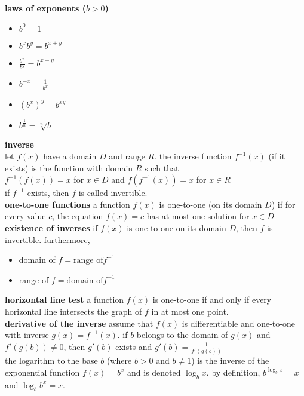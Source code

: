 \documentclass{article}
\begin{document}
\textbf{laws of exponents ($b > 0$)}
	\begin{itemize}
		\item $b^0 = 1$
		\item $b^xb^y = b^{x + y}$
		\item $\frac{b^x}{b^y} = b^{x - y}$
		\item $b^{-x} = \frac{1}{b^x}$
		\item $(b^x)^y = b^{xy}$
		\item $b^{\frac{1}{n}} = \sqrt[n]{b}$
	\end{itemize}

\textbf{inverse}\\
let $f(x)$ have a domain $D$ and range $R$. the inverse function $f^{-1}(x)$ (if it exists) is the function with domain $R$ such that\\ $f^{-1}(f(x)) = x$ for $x \in D$ and $f(f^{-1}(x)) = x$ for $x \in R$\\ if $f^{-1}$ exists, then $f$ is called invertible.\\

\textbf{one-to-one functions} a function $f(x)$ is one-to-one (on its domain $D$) if for every value $c$, the equation $f(x) = c$ has at most one solution for $x \in D$\\

\textbf{existence of inverses} if $f(x)$ is one-to-one on its domain $D$, then $f$ is invertible. furthermore,
	\begin{itemize}
		\item domain of $f = \text{range of} f^{-1}$
		\item range of $f = \text{domain of} f^{-1}$ 
	\end{itemize}

\textbf{horizontal line test} a function $f(x)$ is one-to-one if and only if every horizontal line intersects the graph of $f$ in at most one point.\\

\textbf{derivative of the inverse} assume that $f(x)$ is differentiable and one-to-one with inverse $g(x) = f^{-1}(x)$. if $b$ belongs to the domain of $g(x)$ and $f'(g(b)) \neq 0$, then $g'(b)$ exists and $g'(b) = \frac{1}{f'(g(b))}$\\

the logarithm to the base $b$ (where $b > 0$ and $b \neq 1$) is the inverse of the exponential function $f(x) = b^x$ and is denoted $\log_{b}x$. by definition, $b^{\log_{b}x} = x$ and $\log_{b}b^x = x$.\\
\end{document}
